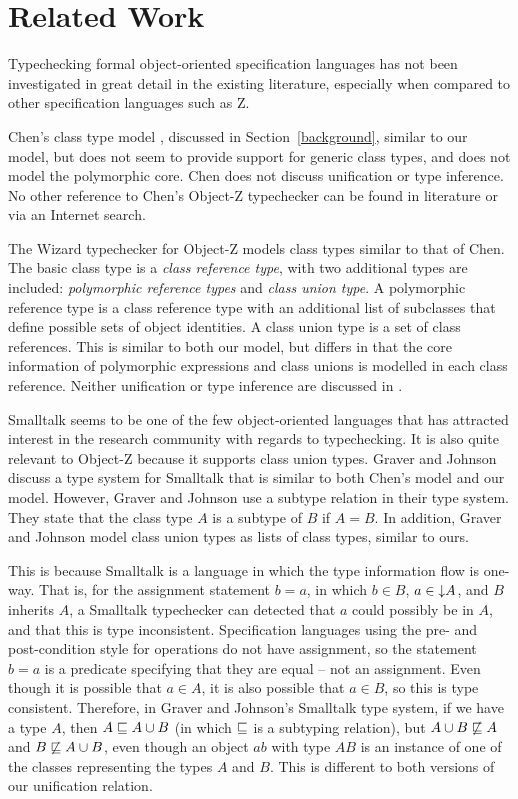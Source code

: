 \section{Related Work}

Typechecking formal object-oriented specification languages has not
been investigated in great detail in the existing literature,
especially when compared to other specification languages such as Z.

Chen's class type model \cite{chen94}, discussed in
Section~\ref{background}, similar to our model, but does not seem to
provide support for generic class types, and does not model the
polymorphic core. Chen does not discuss unification or type
inference. No other reference to Chen's Object-Z typechecker can be
found in literature or via an Internet search.

The Wizard typechecker for Object-Z \cite{johnston96} models class
types similar to that of Chen. The basic class type is a {\em class
reference type}, with two additional types are included: {\em
polymorphic reference types} and {\em class union type}. A polymorphic
reference type is a class reference type with an additional list of
subclasses that define possible sets of object identities. A class
union type is a set of class references. This is similar to both our
model, but differs in that the core information of polymorphic
expressions and class unions is modelled in each class
reference. Neither unification or type inference are discussed in
\cite{johnston96}.

Smalltalk \cite{goldberg83} seems to be one of the few object-oriented
languages that has attracted interest in the research community with
regards to typechecking. It is also quite relevant to Object-Z because
it supports class union types. Graver and Johnson \cite{graver90}
discuss a type system for Smalltalk that is similar to both Chen's
model and our model. However, Graver and Johnson use a subtype
relation in their type system.
They state that the class type $A$ is a subtype of
$B$ if $A = B$. In addition, Graver and Johnson model class union
types as lists of class types, similar to ours. 

This is because Smalltalk is a language in which the type information
flow is one-way. That is, for the assignment statement $b = a$, in
which $b \in B$, $a \in \mathord\downarrow A$, and $B$ inherits $A$, a Smalltalk
typechecker can detected that $a$ could possibly be in $A$, and that
this is type inconsistent. Specification languages using the pre- and
post-condition style for operations do not have assignment, so the
statement $b = a$ is a predicate specifying that they are equal -- not
an assignment. Even though it is possible that $a \in A$, it is also
possible that $a \in B$, so this is type consistent. Therefore, in
Graver and Johnson's Smalltalk type system, if we have a type $A$,
then $A \subtypeeq A \classuni B$ (in which $\mathrel{\mathstrut{\sqsubseteq}}$ is a
subtyping relation), but $A \classuni B \not\subtypeeq A$ and $B
\not\subtypeeq A \classuni B$, even though an object $ab$ with type
$AB$ is an instance of one of the classes representing the types $A$
and $B$. This is different to both versions of our unification
relation.

